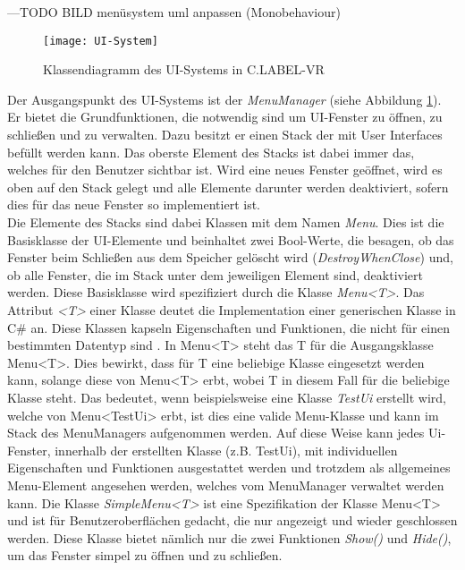 ---TODO BILD menüsystem uml anpassen (Monobehaviour)

\begin{figure}%
	\centering
    \texttt{[image: UI-System]}
    \caption{Klassendiagramm des UI-Systems in C.LABEL-VR}
    \label{fig:UI-System}
\end{figure}

Der Ausgangspunkt des UI-Systems ist der \textit{MenuManager} (siehe Abbildung \ref{fig:UI-System}). Er bietet die Grundfunktionen, die notwendig sind um UI-Fenster zu öffnen, zu schließen und zu verwalten. Dazu besitzt er einen Stack der mit User Interfaces befüllt werden kann. Das oberste Element des Stacks ist dabei immer das, welches für den Benutzer sichtbar ist. Wird eine neues Fenster geöffnet, wird es oben auf den Stack gelegt und alle Elemente darunter werden deaktiviert, sofern dies für das neue Fenster so implementiert ist.\\

Die Elemente des Stacks sind dabei Klassen mit dem Namen \textit{Menu}. Dies ist die Basisklasse der UI-Elemente und beinhaltet zwei Bool-Werte, die besagen, ob das Fenster beim Schließen aus dem Speicher gelöscht wird (\textit{DestroyWhenClose}) und, ob alle Fenster, die im Stack unter dem jeweiligen Element sind, deaktiviert werden. Diese Basisklasse wird spezifiziert durch die Klasse \textit{Menu<T>}. Das Attribut \textit{<T>} einer Klasse deutet die Implementation einer generischen Klasse in C\# an. Diese Klassen kapseln Eigenschaften und Funktionen, die nicht für einen bestimmten Datentyp sind \cite{bib:Generics}. In Menu<T> steht das T für die Ausgangsklasse Menu<T>. Dies bewirkt, dass für T eine beliebige Klasse eingesetzt werden kann, solange diese von Menu<T> erbt, wobei T in diesem Fall für die beliebige Klasse steht. Das bedeutet, wenn beispielsweise eine Klasse \textit{TestUi} erstellt wird, welche von Menu<TestUi> erbt, ist dies eine valide Menu-Klasse und kann im Stack des MenuManagers aufgenommen werden. Auf diese Weise kann jedes Ui-Fenster, innerhalb der erstellten Klasse (z.B. TestUi),  mit individuellen Eigenschaften und Funktionen ausgestattet werden und trotzdem als allgemeines Menu-Element angesehen werden, welches vom MenuManager verwaltet werden kann. Die Klasse \textit{SimpleMenu<T>} ist eine Spezifikation der Klasse Menu<T> und ist für Benutzeroberflächen gedacht, die nur angezeigt und wieder geschlossen werden. Diese Klasse bietet nämlich nur die zwei Funktionen \textit{Show()} und \textit{Hide()}, um das Fenster simpel zu öffnen und zu schließen.\\

